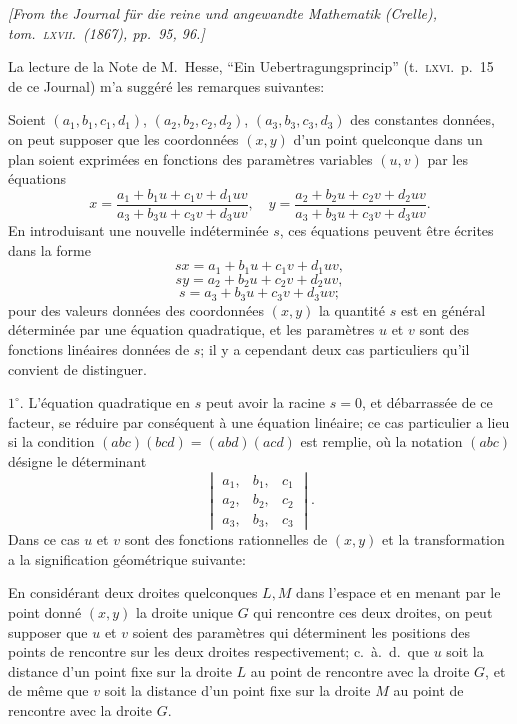 \documentclass[11pt,a4paper]{article}
\begin{document}
\begin{center}
\textit{[From the Journal f\"ur die reine und angewandte Mathematik (Crelle), tom.\ \textsc{lxvii}.\ (1867), pp.\ 95, 96.]}
\end{center}

\medskip

La lecture de la Note de M.\ Hesse, ``Ein Uebertragungsprincip'' (t.\ \textsc{lxvi}.\ p.\ 15
de ce Journal) m'a sugg\'er\'e les remarques suivantes:

Soient $(a_1, b_1, c_1, d_1)$, $(a_2, b_2, c_2, d_2)$, $(a_3, b_3, c_3, d_3)$ des
constantes donn\'ees, on peut supposer que les coordonn\'ees $(x, y)$ d'un point
quelconque dans un plan soient exprim\'ees en fonctions des param\`etres variables
$(u, v)$ par les \'equations
\[
x = \frac{a_1 + b_1 u + c_1 v + d_1 uv}{a_3 + b_3 u + c_3 v + d_3 uv},\quad
y = \frac{a_2 + b_2 u + c_2 v + d_2 uv}{a_3 + b_3 u + c_3 v + d_3 uv}.
\]
En introduisant une nouvelle ind\'etermin\'ee $s$, ces \'equations peuvent \^etre \'ecrites
dans la forme
\[
sx = a_1 + b_1 u + c_1 v + d_1 uv,
\]
\[
sy = a_2 + b_2 u + c_2 v + d_2 uv,
\]
\[
s = a_3 + b_3 u + c_3 v + d_3 uv;
\]
pour des valeurs donn\'ees des coordonn\'ees $(x, y)$ la quantit\'e $s$ est en
g\'en\'eral d\'etermin\'ee par une \'equation quadratique, et les param\`etres $u$ et $v$
sont des fonctions lin\'eaires donn\'ees de $s$; il y a cependant deux cas particuliers
qu'il convient de distinguer.

$1^\circ$. L'\'equation quadratique en $s$ peut avoir la racine $s = 0$, et
d\'ebarrass\'ee de ce facteur, se r\'eduire par cons\'equent \`a une \'equation lin\'eaire;
ce cas particulier a lieu si la condition $(abc)(bcd) = (abd)(acd)$ est remplie, o\`u la
notation $(abc)$ d\'esigne le d\'eterminant
\[
\begin{vmatrix}
a_1, & b_1, & c_1 \\
a_2, & b_2, & c_2 \\
a_3, & b_3, & c_3
\end{vmatrix}.
\]
Dans ce cas $u$ et $v$ sont des fonctions rationnelles de $(x, y)$ et la transformation
a la signification g\'eom\'etrique suivante:

En consid\'erant deux droites quelconques $L, M$ dans l'espace et en menant par le point
donn\'e $(x, y)$ la droite unique $G$ qui rencontre ces deux droites, on peut supposer que
$u$ et $v$ soient des param\`etres qui d\'eterminent les positions des points de rencontre
sur les deux droites respectivement; c.\ \`a.\ d.\ que $u$ soit la distance d'un point fixe
sur la droite $L$ au point de rencontre avec la droite $G$, et de m\^eme que $v$ soit la
distance d'un point fixe sur la droite $M$ au point de rencontre avec la droite $G$.
\end{document}
